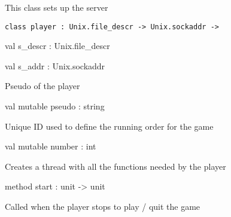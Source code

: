 \documentclass[11pt]{article}
\begin{document}
\begin{ocamldocdescription}
This class sets up the server


\end{ocamldocdescription}




\begin{ocamldoccode}
{\tt{class player : }}{\tt{Unix.file\_descr -> Unix.sockaddr -> }}\end{ocamldoccode}
\label{class:Server.player}

\begin{ocamldocobjectend}


\label{val:Server.player.s-underscoredescr}\begin{ocamldoccode}
val s_descr : Unix.file_descr
\end{ocamldoccode}


\label{val:Server.player.s-underscoreaddr}\begin{ocamldoccode}
val s_addr : Unix.sockaddr
\end{ocamldoccode}
\begin{ocamldocdescription}
Pseudo of the player


\end{ocamldocdescription}


\label{val:Server.player.pseudo}\begin{ocamldoccode}
val mutable pseudo : string
\end{ocamldoccode}
\begin{ocamldocdescription}
Unique ID used to define the running order for the game


\end{ocamldocdescription}


\label{val:Server.player.number}\begin{ocamldoccode}
val mutable number : int
\end{ocamldoccode}
\begin{ocamldocdescription}
Creates a thread with all the functions needed by the player


\end{ocamldocdescription}


\label{method:Server.player.start}\begin{ocamldoccode}
method start : unit -> unit
\end{ocamldoccode}
\begin{ocamldocdescription}
Called when the player stops to play / quit the game



\end{ocamldocdescription}
\end{ocamldocobjectend}
\end{document}
